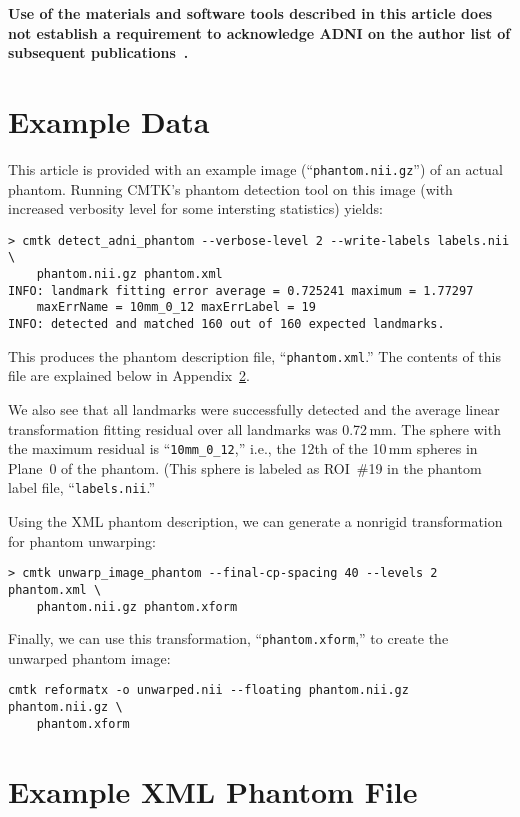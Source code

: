 \documentclass{InsightArticle}
\begin{document}
{\bf Use of the materials and software tools described in this article does not
establish a requirement to acknowledge ADNI on the author list of subsequent
publications~\cite{RohlPoli:2012}.}




\clearpage
\appendix

\section{Example Data}

This article is provided with an example image (``\texttt{phantom.nii.gz}'')
of an actual phantom. Running CMTK's phantom detection tool on this image
(with increased verbosity level for some intersting statistics) yields:
\begin{verbatim}
> cmtk detect_adni_phantom --verbose-level 2 --write-labels labels.nii \
    phantom.nii.gz phantom.xml
INFO: landmark fitting error average = 0.725241 maximum = 1.77297 
    maxErrName = 10mm_0_12 maxErrLabel = 19
INFO: detected and matched 160 out of 160 expected landmarks.
\end{verbatim}
This produces the phantom description file, ``\texttt{phantom.xml}.'' The
contents of this file are explained below in Appendix~\ref{sec:ExampleXML}.

We also see that all landmarks were successfully detected and the average
linear transformation fitting residual over all landmarks was 0.72\,mm. The
sphere with the maximum residual is ``\texttt{10mm\_0\_12},'' i.e., the 12th
of the 10\,mm spheres in Plane~0 of the phantom. (This sphere is labeled as
ROI~\#19 in the phantom label file, ``\texttt{labels.nii}.''

Using the XML phantom description, we can generate a nonrigid transformation
for phantom unwarping:
\begin{verbatim}
> cmtk unwarp_image_phantom --final-cp-spacing 40 --levels 2 phantom.xml \
    phantom.nii.gz phantom.xform
\end{verbatim}
Finally, we can use this transformation, ``\texttt{phantom.xform},'' to create
the unwarped phantom image:
\begin{verbatim}
cmtk reformatx -o unwarped.nii --floating phantom.nii.gz phantom.nii.gz \
    phantom.xform
\end{verbatim}

\section{Example XML Phantom File}
\label{sec:ExampleXML}
\end{document}
